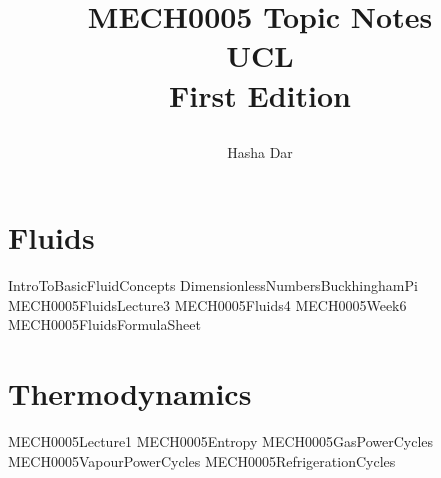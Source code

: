 \documentclass[12pt,a4paper, twoside]{book}
\numberwithin{equation}{section}
\begin{document}
\title{
  {MECH0005 Topic Notes}\\
  {\large UCL}\\
  {\large First Edition}
  \author{Hasha Dar}
}
\maketitle
{\pagestyle{plain}
\tableofcontents
\cleardoublepage}
\chapter{Fluids}
{IntroToBasicFluidConcepts}
{DimensionlessNumbersBuckhinghamPi}
{MECH0005FluidsLecture3}
{MECH0005Fluids4}
{MECH0005Week6}
{MECH0005FluidsFormulaSheet}
\chapter{Thermodynamics}
{MECH0005Lecture1}
{MECH0005Entropy}
{MECH0005GasPowerCycles}
{MECH0005VapourPowerCycles}
{MECH0005RefrigerationCycles}
\listoffigures
\end{document}
